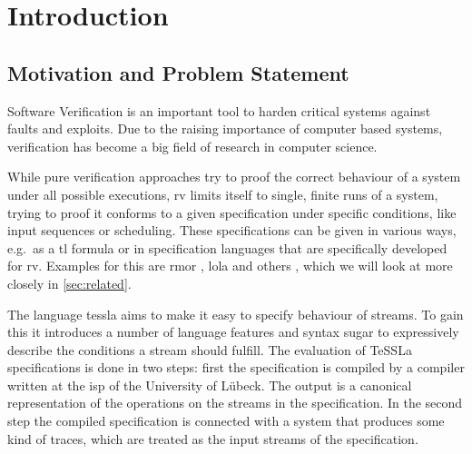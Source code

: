 %
\chapter{Introduction}
\label{sec:intro}


\section{Motivation and Problem Statement}
\label{sec:intro:motivation}

Software Verification is an important tool to harden critical systems against faults and exploits.
Due to the raising importance of computer based systems, verification has become a big field of research in computer science.

While pure verification approaches try to proof the correct behaviour of a system under all possible executions,
\gls{rv} limits itself to single, finite runs of a system, trying to proof it conforms to a given specification
under specific conditions, like input sequences or scheduling.
These specifications can be given in various ways, e.g.\ as a \gls{tl} formula or in specification languages that are specifically developed for \gls{rv}.
Examples for this are \gls{rmor} \citep{Havelund2008}, \gls{lola} \citep{DAngelo2005} and others \citep{Zheng2015, Pike2010, Mostafa2015}, which we will look at more closely in \cref{sec:related}.

The language \gls{tessla} aims to make it easy to specify behaviour of streams.
To gain this it introduces a number of language features and syntax sugar to expressively describe the conditions a stream should fulfill.
The evaluation of TeSSLa specifications is done in two steps: first the specification is compiled by a compiler written at the \gls{isp} of the University of Lübeck.
The output is a canonical representation of the operations on the streams in the specification.
In the second step the compiled specification is connected with a system that produces some kind of traces, which are treated as the input streams of the specification.

